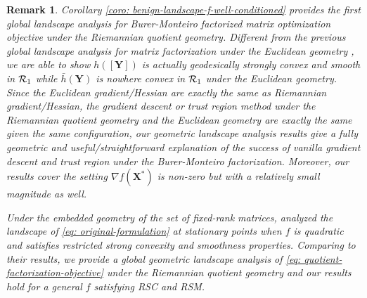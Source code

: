 \documentclass[11pt]{article}
\newtheorem{Remark}{Remark}
\newcommand{\0}{{\mathbf{0}}}
\newcommand{\1}{{\mathbf{1}}}
\newcommand{\X}{{\mathbf{X}}}
\newcommand{\Y}{{\mathbf{Y}}}
\newcommand{\cR}{{\cal R}}
\begin{document}
\begin{Remark} \label{rem:local-geometry}
	Corollary \ref{coro: benign-landscape-f-well-conditioned} provides the first global landscape analysis for Burer-Monteiro factorized matrix optimization objective under the Riemannian quotient geometry. Different from the previous global landscape analysis for matrix factorization under the Euclidean geometry \cite{li2016symmetry,zhu2017global}, we are able to show $h([\Y])$ is actually geodesically strongly convex and smooth in $\cR_1$ while $\bar{h}(\Y)$ is nowhere convex in $\cR_1$ under the Euclidean geometry. Since the Euclidean gradient/Hessian are exactly the same as Riemannian gradient/Hessian, the gradient descent or trust region method under the Riemannian quotient geometry and the Euclidean geometry are exactly the same given the same configuration, our geometric landscape analysis results give a fully geometric and useful/straightforward explanation of the success of vanilla gradient descent and trust region under the Burer-Monteiro factorization. Moreover, our results cover the setting $\nabla f(\X^*)$ is non-zero but with a relatively small magnitude as well.  
	
	 Under the embedded geometry of the set of fixed-rank matrices, \cite{uschmajew2018critical} analyzed the landscape of \eqref{eq: original-formulation} at stationary points when $f$ is quadratic and satisfies restricted strong convexity and smoothness properties. Comparing to their results, we provide a global geometric landscape analysis of \eqref{eq: quotient-factorization-objective} under the Riemannian quotient geometry and our results hold for a general $f$ satisfying RSC and RSM. 
\end{Remark}
\end{document}
